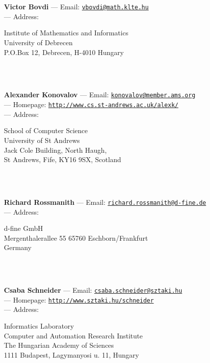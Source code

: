 \documentclass[a4paper,11pt]{report}
\begin{document}
\begin{titlepage}
\mbox{}\\
{\mbox{}\\
\small \noindent \textbf{Victor Bovdi   } --- Email: \href{mailto://vbovdi@math.klte.hu} {\texttt{vbovdi@math.klte.hu}}\\
 --- Address: \begin{minipage}[t]{8cm}\noindent
 Institute of Mathematics and Informatics\\
 University of Debrecen\\
 P.O.Box 12, Debrecen, H-4010 Hungary \end{minipage}
}\\
{\mbox{}\\
\small \noindent \textbf{Alexander Konovalov    } --- Email: \href{mailto://konovalov@member.ams.org} {\texttt{konovalov@member.ams.org}}\\
 --- Homepage: \href{http://www.cs.st-andrews.ac.uk/~alexk/} {\texttt{http://www.cs.st-andrews.ac.uk/\texttt{}alexk/}}\\
 --- Address: \begin{minipage}[t]{8cm}\noindent
 School of Computer Science\\
 University of St Andrews\\
 Jack Cole Building, North Haugh,\\
 St Andrews, Fife, KY16 9SX, Scotland \end{minipage}
}\\
{\mbox{}\\
\small \noindent \textbf{Richard Rossmanith   } --- Email: \href{mailto://richard.rossmanith@d-fine.de} {\texttt{richard.rossmanith@d-fine.de}}\\
 --- Address: \begin{minipage}[t]{8cm}\noindent
 d-fine GmbH\\
 Mergenthalerallee 55 65760 Eschborn/Frankfurt\\
 Germany \end{minipage}
}\\
{\mbox{}\\
\small \noindent \textbf{ Csaba Schneider    } --- Email: \href{mailto://csaba.schneider@sztaki.hu} {\texttt{csaba.schneider@sztaki.hu}}\\
 --- Homepage: \href{http://www.sztaki.hu/~schneider} {\texttt{http://www.sztaki.hu/\texttt{}schneider}}\\
 --- Address: \begin{minipage}[t]{8cm}\noindent
 Informatics Laboratory\\
 Computer and Automation Research Institute\\
 The Hungarian Academy of Sciences\\
 1111 Budapest, Lagymanyosi u. 11, Hungary \end{minipage}
}\\
\end{titlepage}
\end{document}
